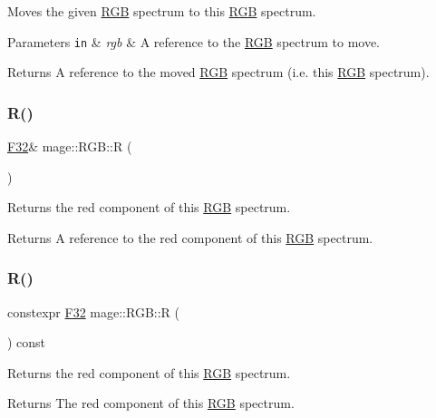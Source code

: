 Moves the given \mbox{\hyperlink{structmage_1_1_r_g_b}{R\+GB}} spectrum to this \mbox{\hyperlink{structmage_1_1_r_g_b}{R\+GB}} spectrum.


\begin{DoxyParams}[1]{Parameters}
\mbox{\tt in}  & {\em rgb} & A reference to the \mbox{\hyperlink{structmage_1_1_r_g_b}{R\+GB}} spectrum to move. \\
\hline
\end{DoxyParams}
\begin{DoxyReturn}{Returns}
A reference to the moved \mbox{\hyperlink{structmage_1_1_r_g_b}{R\+GB}} spectrum (i.\+e. this \mbox{\hyperlink{structmage_1_1_r_g_b}{R\+GB}} spectrum). 
\end{DoxyReturn}
\mbox{\label{structmage_1_1_r_g_b_a0125eee4ebad06ecfc54be1ffe601eb4}} 
\subsubsection{\texorpdfstring{R()}{R()}\hspace{0.1cm}{\footnotesize\ttfamily [1/2]}}
{\footnotesize\ttfamily \mbox{\hyperlink{namespacemage_aa97e833b45f06d60a0a9c4fc22ae02c0}{F32}}\& mage\+::\+R\+G\+B\+::R (\begin{DoxyParamCaption}{ }\end{DoxyParamCaption})\hspace{0.3cm}{\ttfamily [noexcept]}}

Returns the red component of this \mbox{\hyperlink{structmage_1_1_r_g_b}{R\+GB}} spectrum.

\begin{DoxyReturn}{Returns}
A reference to the red component of this \mbox{\hyperlink{structmage_1_1_r_g_b}{R\+GB}} spectrum. 
\end{DoxyReturn}
\mbox{\label{structmage_1_1_r_g_b_ad0a4d0192ecc2a85ba046b62818a8623}} 
\subsubsection{\texorpdfstring{R()}{R()}\hspace{0.1cm}{\footnotesize\ttfamily [2/2]}}
{\footnotesize\ttfamily constexpr \mbox{\hyperlink{namespacemage_aa97e833b45f06d60a0a9c4fc22ae02c0}{F32}} mage\+::\+R\+G\+B\+::R (\begin{DoxyParamCaption}{ }\end{DoxyParamCaption}) const\hspace{0.3cm}{\ttfamily [noexcept]}}

Returns the red component of this \mbox{\hyperlink{structmage_1_1_r_g_b}{R\+GB}} spectrum.

\begin{DoxyReturn}{Returns}
The red component of this \mbox{\hyperlink{structmage_1_1_r_g_b}{R\+GB}} spectrum. 
\end{DoxyReturn}
